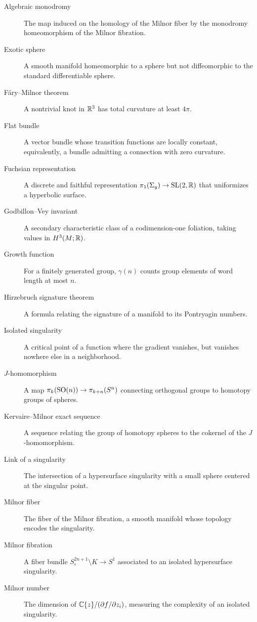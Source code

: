 \begin{description}
    \item[Algebraic monodromy] The map induced on the homology of the Milnor fiber by the monodromy homeomorphism of the Milnor fibration.
    \item[Exotic sphere] A smooth manifold homeomorphic to a sphere but not diffeomorphic to the standard differentiable sphere.
    \item[F\'ary--Milnor theorem] A nontrivial knot in \(\mathbb{R}^3\) has total curvature at least \(4\pi\).
    \item[Flat bundle] A vector bundle whose transition functions are locally constant, equivalently, a bundle admitting a connection with zero curvature.
    \item[Fuchsian representation] A discrete and faithful representation \(\pi_1(\Sigma_g) \to \operatorname{SL}(2,\mathbb{R})\) that uniformizes a hyperbolic surface.
    \item[Godbillon--Vey invariant] A secondary characteristic class of a codimension-one foliation, taking values in \(H^3(M; \mathbb{R})\).
    \item[Growth function] For a finitely generated group, \(\gamma(n)\) counts group elements of word length at most \(n\).
    \item[Hirzebruch signature theorem] A formula relating the signature of a manifold to its Pontryagin numbers.
    \item[Isolated singularity] A critical point of a function where the gradient vanishes, but vanishes nowhere else in a neighborhood.
    \item[\(J\)-homomorphism] A map \(\pi_k(\operatorname{SO}(n)) \to \pi_{k+n}(S^n)\) connecting orthogonal groups to homotopy groups of spheres.
    \item[Kervaire--Milnor exact sequence] A sequence relating the group of homotopy spheres to the cokernel of the \(J\)-homomorphism.
    \item[Link of a singularity] The intersection of a hypersurface singularity with a small sphere centered at the singular point.
    \item[Milnor fiber] The fiber of the Milnor fibration, a smooth manifold whose topology encodes the singularity.
    \item[Milnor fibration] A fiber bundle \(S_\varepsilon^{2n+1} \setminus K \to S^1\) associated to an isolated hypersurface singularity.
    \item[Milnor number] The dimension of \(\mathbb{C}\{z\}/(\partial f/\partial z_i)\), measuring the complexity of an isolated singularity.

\end{description}
